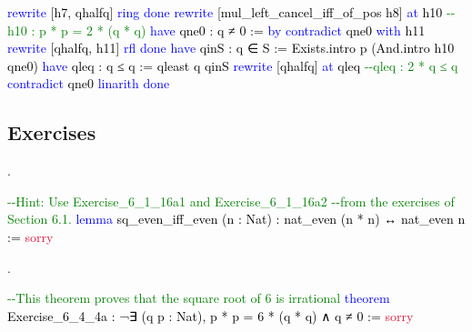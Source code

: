 \documentclass[
  letterpaper,
  DIV=11,
  numbers=noendperiod]{scrreprt}
\newenvironment{Shaded}{\begin{snugshade}}{\end{snugshade}}
\newcommand{\CommentTok}[1]{\textcolor[rgb]{0.37,0.37,0.37}{#1}}
\newcommand{\ConstantTok}[1]{\textcolor[rgb]{0.56,0.35,0.01}{#1}}
\newcommand{\KeywordTok}[1]{\textcolor[rgb]{0.00,0.23,0.31}{#1}}
\newcommand{\NormalTok}[1]{\textcolor[rgb]{0.00,0.23,0.31}{#1}}
\renewcommand{\NormalTok}[1]{\textcolor[HTML]{000000}{#1}}
\renewcommand{\KeywordTok}[1]{\textcolor[HTML]{0000FF}{#1}}
\renewcommand{\CommentTok}[1]{\textcolor[HTML]{008000}{#1}}
\renewcommand{\ConstantTok}[1]{\textcolor[HTML]{DC143C}{#1}}
\newcommand{\nobreakShaded}{\renewenvironment{Shaded}
	{\begin{tcolorbox}[frame hidden, enhanced, interior hidden, boxrule=0pt,
		borderline west={3pt}{0pt}{shadecolor}, sharp corners]}
	{\end{tcolorbox}}}
\newenvironment{numex}[1]
	{\begin{minipage}[t]{0.04\textwidth}\vspace{8pt}{#1}.
		\end{minipage}\nobreakShaded\begin{minipage}[t]{0.96\textwidth}\vspace{0pt}}
	{\end{minipage}}
\theoremstyle{remark}
\begin{document}
\begin{Shaded}
\begin{Highlighting}[]
    \KeywordTok{rewrite}\NormalTok{ [h7, q\textquotesingle{}halfq]}
    \KeywordTok{ring}
    \KeywordTok{done}
  \KeywordTok{rewrite}\NormalTok{ [mul\_left\_cancel\_iff\_of\_pos h8] }\KeywordTok{at}\NormalTok{ h10}
    \CommentTok{{-}{-}h10 : p\textquotesingle{} * p\textquotesingle{} = 2 * (q\textquotesingle{} * q\textquotesingle{})}
  \KeywordTok{have}\NormalTok{ q\textquotesingle{}ne0 : q\textquotesingle{} ≠ 0 := }\KeywordTok{by}
    \KeywordTok{contradict}\NormalTok{ qne0 }\KeywordTok{with}\NormalTok{ h11}
    \KeywordTok{rewrite}\NormalTok{ [q\textquotesingle{}halfq, h11]}
    \KeywordTok{rfl}
    \KeywordTok{done}
  \KeywordTok{have}\NormalTok{ q\textquotesingle{}inS : q\textquotesingle{} ∈ S := Exists.intro p\textquotesingle{} (And.intro h10 q\textquotesingle{}ne0)}
  \KeywordTok{have}\NormalTok{ qleq\textquotesingle{} : q ≤ q\textquotesingle{} := qleast q\textquotesingle{} q\textquotesingle{}inS}
  \KeywordTok{rewrite}\NormalTok{ [q\textquotesingle{}halfq] }\KeywordTok{at}\NormalTok{ qleq\textquotesingle{}        }\CommentTok{{-}{-}qleq\textquotesingle{} : 2 * q\textquotesingle{} ≤ q\textquotesingle{}}
  \KeywordTok{contradict}\NormalTok{ q\textquotesingle{}ne0}
  \KeywordTok{linarith}
  \KeywordTok{done}
\end{Highlighting}
\end{Shaded}

\hypertarget{exercises-17}{%
\subsection{Exercises}\label{exercises-17}}

\begin{numex}{1}

\begin{Shaded}
\begin{Highlighting}[]
\CommentTok{{-}{-}Hint: Use Exercise\_6\_1\_16a1 and Exercise\_6\_1\_16a2}
\CommentTok{{-}{-}from the exercises of Section 6.1.}
\KeywordTok{lemma}\NormalTok{ sq\_even\_iff\_even (n : Nat) :}
\NormalTok{    nat\_even (n * n) ↔ nat\_even n := }\ConstantTok{sorry}
\end{Highlighting}
\end{Shaded}

\end{numex}

\begin{numex}{2}

\begin{Shaded}
\begin{Highlighting}[]
\CommentTok{{-}{-}This theorem proves that the square root of 6 is irrational}
\KeywordTok{theorem}\NormalTok{ Exercise\_6\_4\_4a :}
\NormalTok{    ¬∃ (q p : Nat), p * p = 6 * (q * q) ∧ q ≠ 0 := }\ConstantTok{sorry}
\end{Highlighting}
\end{Shaded}

\end{numex}
\end{document}
